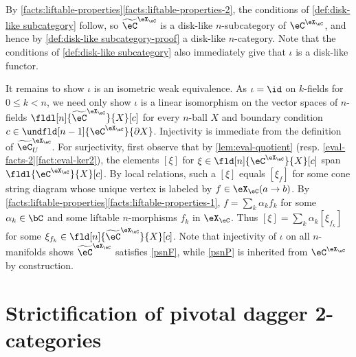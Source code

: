 \documentclass[12pt,reqno]{amsart}
\newcounter{alpha}\renewcommand\thealpha{\upshape\Alph{alpha}}
\newcommand{\C}{\eC}
\begin{document}
\begin{pf}
By \cref{facts:liftable-properties}\ref{facts:liftable-properties-2}, the conditions of \cref{def:disk-like subcategory} follow, so $\widetilde{\C}^{\eX_\C}$ is a disk-like $n$-subcategory of $\C^{\eX_\C}$, and hence by \cref{def:disk-like subcategory-proof} a disk-like $n$-category. Note that the conditions of \cref{def:disk-like subcategory} also immediately give that $\iota$ is a disk-like functor.

It remains to show $\iota$ is an isometric weak equivalence. As $\iota=\id$ on $k$-fields for $0\leq k< n$, we need only show $\iota$ is a linear isomorphism on the vector spaces of $n$-fields $\fldl[n]{\widetilde{\C}^{\eX_\C}}{X}[c]$ for every $n$-ball $X$ and boundary condition $c\in\undfld[n-1]{\C^{\eX_\C}}{\partial X}$. Injectivity is immediate from the definition of ${\widetilde{\C}^{\eX_\C}}_U$. For surjectivity, first observe that by \cref{lem:eval-quotient} (resp. \cref{eval-facts-2}\ref{fact:eval-ker2}), the elements $[\xi]$ for $\xi\in\fld[n]{\C^{\eX_\C}}{X}[c]$ span $\fldl{\C^{\eX_\C}}{X}[c]$. By local relations, such a $[\xi]$ equals $[\xi_f]$ for some cone string diagram whose unique vertex is labeled by $f\in\eX_\C(a\to b)$. By \cref{facts:liftable-properties}\ref{facts:liftable-properties-1}, $f=\sum_k\alpha_k f_k$ for some $\alpha_k\in\bC$ and some liftable $n$-morphisms $f_k$ in $\eX_\C$. Thus $[\xi]=\sum_k\alpha_k[\xi_{f_k}]$ for some $\xi_{f_k}\in \fld[n]{\widetilde{\C}^{\eX_\C}}{X}[c]$. Note that injectivity of $\iota$ on all $n$-manifolds shows $\widetilde{\C}^{\eX_\C}$ satisfies \ref{psnF}, while \ref{psnP} is inherited from $\C^{\eX_\C}$ by construction. 
\end{pf}

\section{Strictification of pivotal dagger 2-categories}
\label{strictification-sec}
\newcommand{\fr}[1]{\draw[frame] #1;}
\newcommand{\wl}[3]{\node[wire label, anchor=#1] at #2 {$#3$};}
\newcommand{\vl}[3]{\node[val label, anchor=#1] at #2 {$#3$};}
\end{document}
